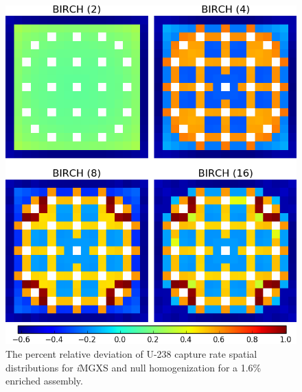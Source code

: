 \begin{figure}[h!]
\centering
\includegraphics[width=0.9\linewidth]{figures/results/compare/assm-16/compare-capt}
\vspace{2mm}
\caption[U-238 capture rate comparison for a 1.6\% enriched assembly]{The percent relative deviation of U-238 capture rate spatial distributions for \textit{i}\ac{MGXS} and null homogenization for a 1.6\% enriched assembly.}
\label{fig:chap11-assm-1.6-capt-rates-comp}
\end{figure}

\clearpage

